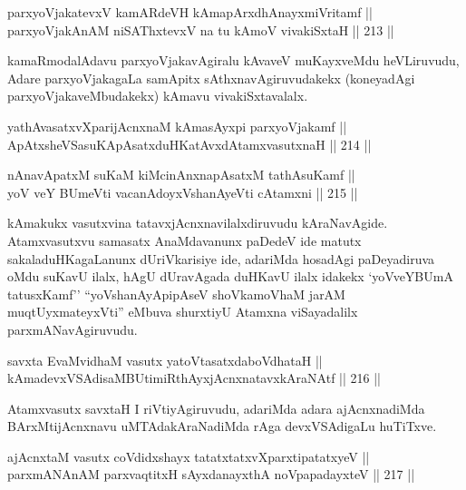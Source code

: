 \begin{shl}
parxyoVjakatevxV kamARdeVH kAmapArxdhAnayxmiVritamf || \\
parxyoVjakAnAM niSAThxtevxV na tu kAmoV vivakiSxtaH \hfill || 213 ||  
\end{shl}

\begin{artha}
kamaRmodalAdavu parxyoVjakavAgiralu kAvaveV muKayxveMdu heVLiruvudu,
Adare parxyoVjakagaLa samApitx sAthxnavAgiruvudakekx (koneyadAgi
parxyoVjakaveMbudakekx) kAmavu vivakiSxtavalalx.
\end{artha}

\begin{shl}
yathAvasatxvXparijAcnxnaM kAmasAyxpi parxyoVjakamf ||  \\
ApAtxsheVSasuKApAsatxduHKatAvxdAtamxvasutxnaH \hfill || 214 ||  
\end{shl}

\begin{shl}
nAnavApatxM suKaM kiMcinAnxnapAsatxM tathA\s suKamf || \\
yoV veY BUmeVti vacanAdoyxV\s shanAyeVti cA\s \s tamxni \hfill || 215 ||  
\end{shl}


\begin{artha}
kAmakukx vasutxvina tatavxjAcnxnavilalxdiruvudu
kAraNavAgide. Atamxvasutxvu samasatx AnaMdavanunx paDedeV ide matutx
sakaladuHKagaLanunx dUriVkarisiye ide, adariMda hosadAgi paDeyadiruva 
oMdu suKavU ilalx, hAgU dUravAgada duHKavU ilalx idakekx `yoVveYBUmA
tatusxKamf'' ``yoV\s shanAyApipAseV shoVkamoVhaM jarAM
muqtUyxmateyxVti'' eMbuva shurxtiyU Atamxna viSayadalilx
parxmANavAgiruvudu.
\end{artha}

\begin{shl}
savxta EvaMvidhaM vasutx yatoV\s tasatxdaboVdhataH || \\
kAmadevxVSAdisaMBUtimiRthAyxjAcnxnatavxkAraNAtf \hfill || 216 ||  
\end{shl}

\begin{artha}
Atamxvasutx savxtaH I riVtiyAgiruvudu, adariMda adara ajAcnxnadiMda
BArxMtijAcnxnavu uMTAdakAraNadiMda rAga devxVSAdigaLu huTiTxve.
\end{artha}

\begin{shl}
ajAcnxtaM vasutx coVdidxshayx tatatxtatxvXparxtipatatxyeV || \\
parxmANAnAM parxvaqtitxH sAyxdanayxthA noVpapadayxteV \hfill || 217 ||  
\end{shl}

